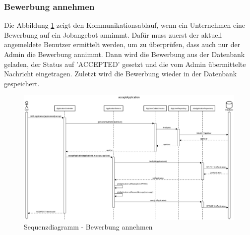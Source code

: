 \documentclass[12pt, letterpaper]{article}
\begin{document}
    \subsubsection{Bewerbung annehmen}

    Die Abbildung \ref{fig:Accept} zeigt den Kommunikationsablauf, wenn ein Unternehmen eine Bewerbung auf ein Jobangebot annimmt. Dafür muss zuerst
    der aktuell angemeldete Benutzer ermittelt werden, um zu überprüfen, dass auch nur der Admin die Bewerbung annimmt. 
    Dann wird die Bewerbung aus der Datenbank geladen, der Status auf 'ACCEPTED' gesetzt und die vom Admin übermittelte Nachricht eingetragen.
    Zuletzt wird die Bewerbung wieder in der Datenbank gespeichert.
    \begin{figure}[h!]
        \includegraphics[width = \linewidth]{sequence/acceptApplicationSequenzDiagramm.png}
        \caption{Sequenzdiagramm - Bewerbung annehmen}
        \label{fig:Accept}
    \end{figure}
\end{document}
